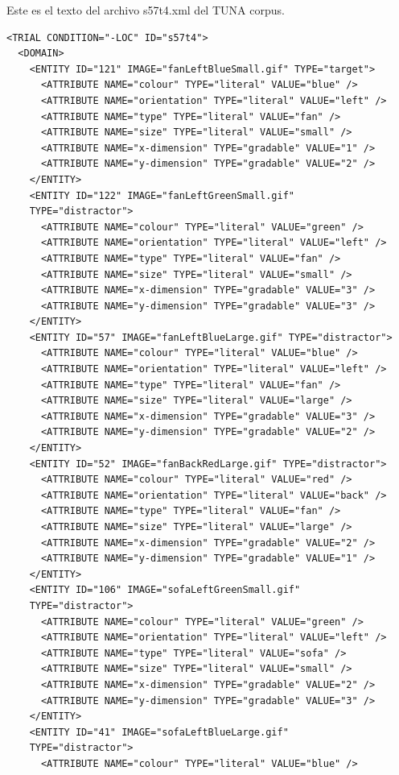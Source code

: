 Este es el texto del archivo s57t4.xml del TUNA corpus.
\begin{verbatim}
<TRIAL CONDITION="-LOC" ID="s57t4">
  <DOMAIN>
    <ENTITY ID="121" IMAGE="fanLeftBlueSmall.gif" TYPE="target">
      <ATTRIBUTE NAME="colour" TYPE="literal" VALUE="blue" />
      <ATTRIBUTE NAME="orientation" TYPE="literal" VALUE="left" />
      <ATTRIBUTE NAME="type" TYPE="literal" VALUE="fan" />
      <ATTRIBUTE NAME="size" TYPE="literal" VALUE="small" />
      <ATTRIBUTE NAME="x-dimension" TYPE="gradable" VALUE="1" />
      <ATTRIBUTE NAME="y-dimension" TYPE="gradable" VALUE="2" />
    </ENTITY>
    <ENTITY ID="122" IMAGE="fanLeftGreenSmall.gif"
    TYPE="distractor">
      <ATTRIBUTE NAME="colour" TYPE="literal" VALUE="green" />
      <ATTRIBUTE NAME="orientation" TYPE="literal" VALUE="left" />
      <ATTRIBUTE NAME="type" TYPE="literal" VALUE="fan" />
      <ATTRIBUTE NAME="size" TYPE="literal" VALUE="small" />
      <ATTRIBUTE NAME="x-dimension" TYPE="gradable" VALUE="3" />
      <ATTRIBUTE NAME="y-dimension" TYPE="gradable" VALUE="3" />
    </ENTITY>
    <ENTITY ID="57" IMAGE="fanLeftBlueLarge.gif" TYPE="distractor">
      <ATTRIBUTE NAME="colour" TYPE="literal" VALUE="blue" />
      <ATTRIBUTE NAME="orientation" TYPE="literal" VALUE="left" />
      <ATTRIBUTE NAME="type" TYPE="literal" VALUE="fan" />
      <ATTRIBUTE NAME="size" TYPE="literal" VALUE="large" />
      <ATTRIBUTE NAME="x-dimension" TYPE="gradable" VALUE="3" />
      <ATTRIBUTE NAME="y-dimension" TYPE="gradable" VALUE="2" />
    </ENTITY>
    <ENTITY ID="52" IMAGE="fanBackRedLarge.gif" TYPE="distractor">
      <ATTRIBUTE NAME="colour" TYPE="literal" VALUE="red" />
      <ATTRIBUTE NAME="orientation" TYPE="literal" VALUE="back" />
      <ATTRIBUTE NAME="type" TYPE="literal" VALUE="fan" />
      <ATTRIBUTE NAME="size" TYPE="literal" VALUE="large" />
      <ATTRIBUTE NAME="x-dimension" TYPE="gradable" VALUE="2" />
      <ATTRIBUTE NAME="y-dimension" TYPE="gradable" VALUE="1" />
    </ENTITY>
    <ENTITY ID="106" IMAGE="sofaLeftGreenSmall.gif"
    TYPE="distractor">
      <ATTRIBUTE NAME="colour" TYPE="literal" VALUE="green" />
      <ATTRIBUTE NAME="orientation" TYPE="literal" VALUE="left" />
      <ATTRIBUTE NAME="type" TYPE="literal" VALUE="sofa" />
      <ATTRIBUTE NAME="size" TYPE="literal" VALUE="small" />
      <ATTRIBUTE NAME="x-dimension" TYPE="gradable" VALUE="2" />
      <ATTRIBUTE NAME="y-dimension" TYPE="gradable" VALUE="3" />
    </ENTITY>
    <ENTITY ID="41" IMAGE="sofaLeftBlueLarge.gif"
    TYPE="distractor">
      <ATTRIBUTE NAME="colour" TYPE="literal" VALUE="blue" />

\end{verbatim}

